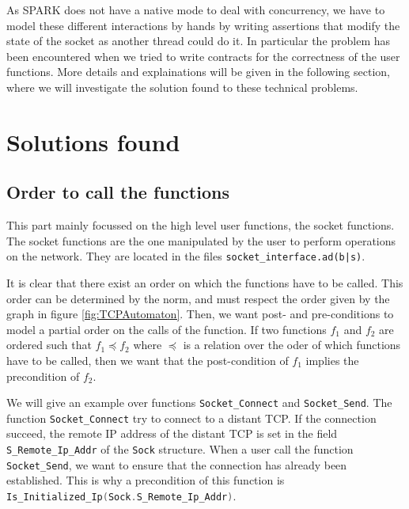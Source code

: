 \documentclass[a4paper, 10pt]{article}
\begin{document}
    As SPARK does not have a native mode to deal with concurrency, we have to
    model these different interactions by hands by writing assertions that
    modify the state of the socket as another thread could do it. In particular
    the problem has been encountered when we tried to write contracts for the correctness
    of the user functions. More details and explainations will be given in the following
    section, where we will investigate the solution found to these technical problems.

    \section{Solutions found}

    \subsection{Order to call the functions}

    This part mainly focussed on the high level user functions, the socket functions.
    The socket functions are the one manipulated by the user to perform operations on
    the network. They are located in the files \texttt{socket\_interface.ad(b|s)}.

    It is clear that there exist an order on which the functions have to be called.
    This order can be determined by the norm, and must respect the order given by the
    graph in figure \ref{fig:TCPAutomaton}.
    Then, we want post- and pre-conditions to model a partial order on the calls of the function.
    If two functions $f_1$ and $f_2$ are ordered such that $f_1 \preceq f_2$ where $\preceq$ is
    a relation over the oder of which functions have to be called, then we want that the
    post-condition of $f_1$ implies the precondition of $f_2$.
    
    We will give an example over functions \lstinline[language=Ada]{Socket_Connect} and
    \lstinline[language=Ada]{Socket_Send}. The function \lstinline[language=Ada]{Socket_Connect}
    try to connect to a distant TCP. If the connection succeed, the remote IP address of the distant
    TCP is set in the field \lstinline[language=Ada]{S_Remote_Ip_Addr} of the \lstinline[language=Ada]{Sock}
    structure. When a user call the function \lstinline[language=Ada]{Socket_Send}, we want to ensure that
    the connection has already been established. This is why a precondition of this function is
    \lstinline[language=Ada]{Is_Initialized_Ip(Sock.S_Remote_Ip_Addr)}.
\end{document}
